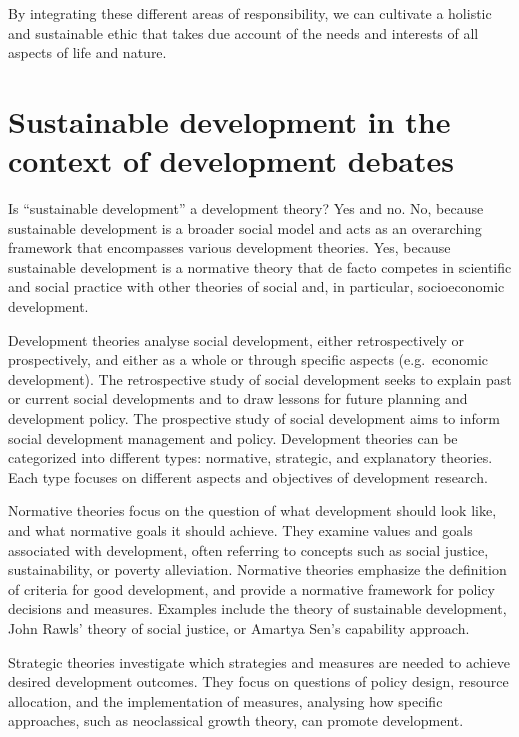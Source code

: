 \documentclass[
  a4paper,
  DIV=11,
  numbers=noendperiod,
  oneside,
  openany]{scrreprt}
\begin{document}
By integrating these different areas of responsibility, we can cultivate
a holistic and sustainable ethic that takes due account of the needs and
interests of all aspects of life and nature.

\section{Sustainable development in the context of development
debates}\label{sustainable-development-in-the-context-of-development-debates}

Is ``sustainable development'' a development theory? Yes and no. No,
because sustainable development is a broader social model and acts as an
overarching framework that encompasses various development theories.
Yes, because sustainable development is a normative theory that de facto
competes in scientific and social practice with other theories of social
and, in particular, socioeconomic development.

Development theories analyse social development, either retrospectively
or prospectively, and either as a whole or through specific aspects
(e.g.~economic development). The retrospective study of social
development seeks to explain past or current social developments and to
draw lessons for future planning and development policy. The prospective
study of social development aims to inform social development management
and policy. Development theories can be categorized into different
types: normative, strategic, and explanatory theories. Each type focuses
on different aspects and objectives of development research.

Normative theories focus on the question of what development should look
like, and what normative goals it should achieve. They examine values
and goals associated with development, often referring to concepts such
as social justice, sustainability, or poverty alleviation. Normative
theories emphasize the definition of criteria for good development, and
provide a normative framework for policy decisions and measures.
Examples include the theory of sustainable development, John Rawls'
theory of social justice, or Amartya Sen's capability approach.

Strategic theories investigate which strategies and measures are needed
to achieve desired development outcomes. They focus on questions of
policy design, resource allocation, and the implementation of measures,
analysing how specific approaches, such as neoclassical growth theory,
can promote development.
\end{document}

